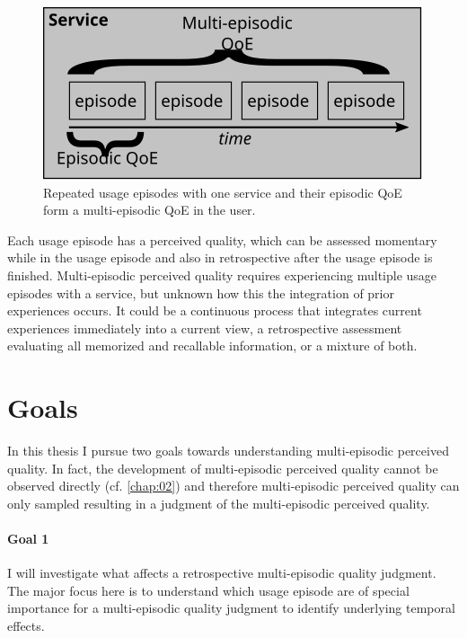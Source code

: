 \begin{figure}
	\centering
	\includegraphics[width=1\columnwidth]{fig/multi-episodic}
	\caption{Repeated usage episodes with one service and their episodic QoE form a multi-episodic QoE in the user.}
	\label{img:chap01:multi-episodic}
\end{figure}

Each usage episode has a perceived quality, which can be assessed momentary while in the usage episode and also in retrospective after the usage episode is finished.
Multi-episodic perceived quality requires experiencing multiple usage episodes with a service, but unknown how this the integration of prior experiences occurs.
It could be a continuous process that integrates current experiences immediately into a current view, a retrospective assessment evaluating all memorized and recallable information, or a mixture of both. %

\section{Goals}
In this thesis I pursue two goals towards understanding multi-episodic perceived quality.
In fact, the development of multi-episodic perceived quality cannot be observed directly (cf. \autoref{chap:02}) and therefore multi-episodic perceived quality can only sampled resulting in a judgment of the multi-episodic perceived quality.

\paragraph*{Goal 1}
I will investigate what affects a retrospective multi-episodic quality judgment.
The major focus here is to understand which usage episode are of special importance for a multi-episodic quality judgment to identify underlying temporal effects.

